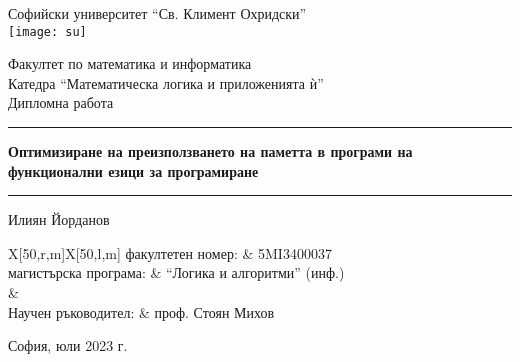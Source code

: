 \documentclass[12pt,twoside,a4paper]{article}
\begin{document}
	\pagestyle{fancy}
	\fancyhf{}
	\fancyhead[L]{\thepage}
	\fancyhead[R]{\nouppercase\rightmark}
	\renewcommand{\headrulewidth}{3pt}
	\renewcommand{\subsectionmark}[1]{%
		\markright{\thesubsection.\ #1}
	}
	\renewcommand{\sectionmark}[1]{%
		\markright{\thesection.\ #1}
	}
	
	\begin{titlepage}
		\begin{center}
			\LARGE
			Софийски университет "`Св. Климент Охридски"'\\
			
			\vspace{0.9cm}
			\texttt{[image: su]}
			
			\LARGE
			Факултет по математика и информатика\\
			Катедра "`Математическа логика и приложенията ѝ"'\\
			
			\vspace{0.9cm}
			Дипломна работа\\
			
			\vspace{1.3cm}
			{\color{blue}\hrule depth 0.05cm}
			\Huge
			\textbf{Оптимизиране на преизползването на паметта в програми на функционални езици за програмиране}
			\vspace{0.2cm}
			{\color{blue}\hrule depth 0.05cm}
			
			\vspace{1.3cm}
			\Large
			Илиян Йорданов\\
			
			\vspace{0.2cm}
			\begin{table}[ht]
				\vspace*{-0.2cm}
				\begin{tblr}{X[50,r,m]X[50,l,m]}
					\Large факултетен номер: & \Large 5MI3400037 \\ 
					\Large магистърска програма: & \Large "`Логика и алгоритми"' (инф.) \\ 
					& \\
					\Large Научен ръководител: & \Large проф. Стоян Михов \\
				\end{tblr}
			\end{table}
			
			\vspace{0.6cm}
			София, юли 2023 г.
		\end{center}
	\end{titlepage}
	\clearpage
	
\end{document}
